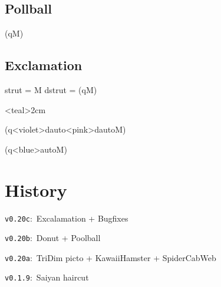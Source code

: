 \documentclass[english,10pt,a4paper]{article}
\begin{document}
\subsection{Pollball}

\begin{codehigh}[language=latex/latex2]

\end{codehigh}

\begin{demohigh}[language=latex/latex2]
\tkzpoolball{2cm}\tkzpoolball[color=teal,number=4]{2cm}

{\Huge (qM)}
\end{demohigh}

\subsection{Exclamation}

\begin{codehigh}[language=latex/latex2]

strut           = {M}
dstrut          = {(qM)}
\end{codehigh}

\begin{demohigh}[language=latex/latex2]
\tkzexcla{2cm}\tkzexcla<teal>{2cm}

{\Huge (q\tkzexcla<violet>{dauto}\tkzexcla[rescale=0.75]<pink>{dauto}M)}

{\Huge\sffamily (q\tkzexcla<blue>{auto}M)}
\end{demohigh}

\pagebreak

\section{History}

\verb|v0.20c|:~Excalamation + Bugfixes

\verb|v0.20b|:~Donut + Poolball

\verb|v0.20a|:~TriDim picto + KawaiiHamster + SpiderCabWeb

\verb|v0.1.9|:~Saiyan haircut
\end{document}
